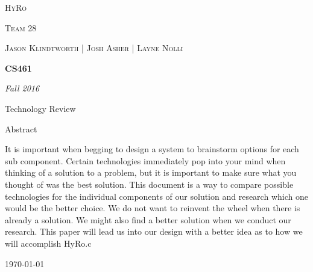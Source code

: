\documentclass[10pt,draftclsnofoot,onecolumn]{IEEEtran}
\begin{document}
\begin{titlepage}
\centering
	{\scshape\LARGE HyRo \par}
	{\scshape\LARGE Team 28\par}
	\vspace{1cm}
	{\scshape\Large Jason Klindtworth  |  Josh Asher  |   Layne Nolli}
	\noindent\makebox[\linewidth]{\rule{17cm}{2pt}}
	\vspace{1cm}
	{\huge\bfseries CS461\par}
	\vspace{2cm}
	{\Large\itshape Fall 2016\par}
	\vspace{4cm}
	{\large Technology Review\par}
	\vspace{4cm}
	{\large Abstract\par}
	\vspace{1cm}
It is important when begging to design a system to brainstorm options for each sub component. Certain technologies immediately pop into your mind when thinking of a solution to a problem, but it is important to make sure what you thought of was the best solution. This document is a way to compare possible technologies for the individual components of our solution and research which one would be the better choice. We do not want to reinvent the wheel when there is already a solution. We might also find a better solution when we conduct our research. This paper will lead us into our design with a better idea as to how we will accomplish HyRo.c\\
	\noindent\makebox[\linewidth]{\rule{17cm}{2pt}}

	\vfill

	{\large \today\par}
\end{titlepage}
\tableofcontents
\end{document}
